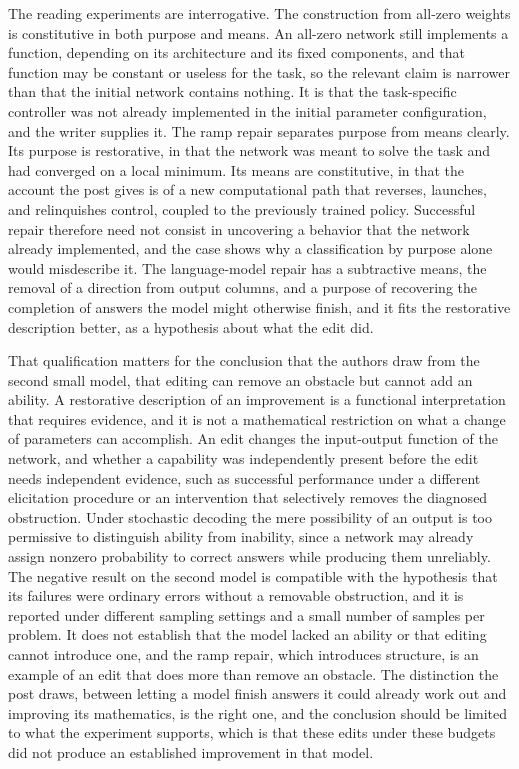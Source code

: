 \documentclass[11pt]{article}
\begin{document}
The reading experiments are interrogative. The construction from all-zero weights is constitutive in both purpose and means. An all-zero network still implements a function, depending on its architecture and its fixed components, and that function may be constant or useless for the task, so the relevant claim is narrower than that the initial network contains nothing. It is that the task-specific controller was not already implemented in the initial parameter configuration, and the writer supplies it. The ramp repair separates purpose from means clearly. Its purpose is restorative, in that the network was meant to solve the task and had converged on a local minimum. Its means are constitutive, in that the account the post gives is of a new computational path that reverses, launches, and relinquishes control, coupled to the previously trained policy. Successful repair therefore need not consist in uncovering a behavior that the network already implemented, and the case shows why a classification by purpose alone would misdescribe it. The language-model repair has a subtractive means, the removal of a direction from output columns, and a purpose of recovering the completion of answers the model might otherwise finish, and it fits the restorative description better, as a hypothesis about what the edit did.

That qualification matters for the conclusion that the authors draw from the second small model, that editing can remove an obstacle but cannot add an ability. A restorative description of an improvement is a functional interpretation that requires evidence, and it is not a mathematical restriction on what a change of parameters can accomplish. An edit changes the input-output function of the network, and whether a capability was independently present before the edit needs independent evidence, such as successful performance under a different elicitation procedure or an intervention that selectively removes the diagnosed obstruction. Under stochastic decoding the mere possibility of an output is too permissive to distinguish ability from inability, since a network may already assign nonzero probability to correct answers while producing them unreliably. The negative result on the second model is compatible with the hypothesis that its failures were ordinary errors without a removable obstruction, and it is reported under different sampling settings and a small number of samples per problem. It does not establish that the model lacked an ability or that editing cannot introduce one, and the ramp repair, which introduces structure, is an example of an edit that does more than remove an obstacle. The distinction the post draws, between letting a model finish answers it could already work out and improving its mathematics, is the right one, and the conclusion should be limited to what the experiment supports, which is that these edits under these budgets did not produce an established improvement in that model.
\end{document}
